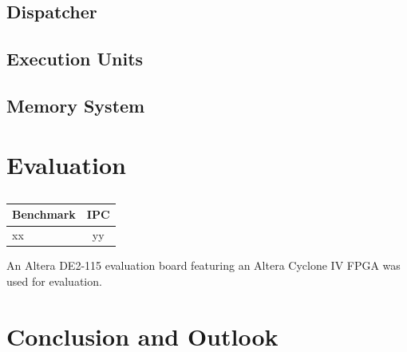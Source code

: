 \documentclass[conference]{IEEEtran}
\begin{document}
\subsection{Dispatcher}

\subsection{Execution Units}

\subsection{Memory System} \label{sec:memory}

\section{Evaluation} \label{sec:eval}




\begin{table} [h]
	\caption{}
	\centering
	\begin{tabular}{l c}
			Benchmark & IPC \\
		\midrule
			xx & yy\\
	\end{tabular}
	
	
	\label{tab:results}
\end{table}


An Altera DE2-115 evaluation board featuring an Altera Cyclone IV FPGA was used for evaluation.

\section{Conclusion and Outlook}



\cite{HP}


\printbibliography
\end{document}
